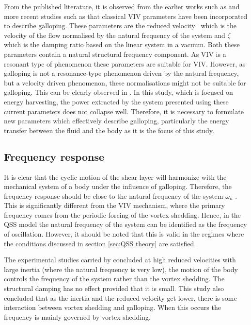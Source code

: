 From the published literature, it is observed from the earlier works such as \citet{Parkinson1961,Luo1994} and more recent studies such as \citet{Luo2003,Barrero-Gil2010a,Joly2012} that classical VIV parameters have been incorporated to describe galloping. These parameters are the reduced velocity \ustar\ which is the velocity of the flow normalised by the natural frequency of the system and $\zeta$ which is the damping ratio based on the linear system in a vacuum. Both these parameters contain a natural structural frequency component. As VIV is a resonant type of phenomenon these parameters are suitable for VIV. However, as galloping is not a resonance-type phenomenon driven by the natural frequency, but a velocity driven phenomenon, these normalisations might not be suitable for galloping. This can be clearly observed in \citet{Barrero-Gil2010a}. In this study, which is focused on energy harvesting, the power extracted by the system presented using these current parameters does not collapse well. Therefore, it is necessary to formulate new parameters which effectively describe galloping, particularly the energy transfer between the fluid and the body as it is the focus of this study.     


\subsection{Frequency response}
 
 It is clear that the cyclic motion of the shear layer will harmonize with the mechanical system of a body under the influence of galloping. Therefore, the frequency response should be close to the natural frequency of the system $\omega_{n}$ \citep{Paidoussis2010}. This is significantly different from the VIV mechanism, where the primary frequency comes from the periodic forcing of the vortex shedding. Hence, in the QSS model the natural frequency of the system can be identified as the frequency of oscillation. However, it should be  noted that this is valid in the regimes where the conditions discussed in section \ref{sec:QSS theory} are satisfied. 
 
 The experimental studies carried by \citet{bouclin:77} concluded at high reduced velocities with large inertia (where the natural frequency is very low), the motion of the body controls the frequency of the system rather than the vortex shedding. The structural damping has no effect provided that it is small. This study also concluded that as the inertia and the reduced velocity get lower, there is some interaction between vortex shedding and galloping. When this occurs the frequency is mainly governed by vortex shedding. 
 
